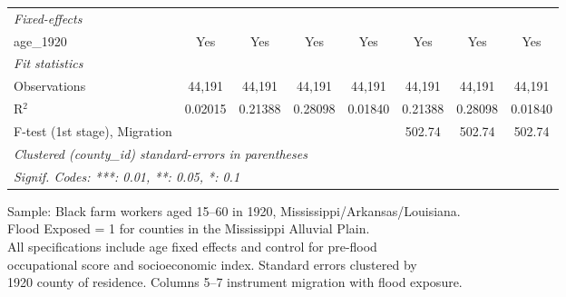 \begin{table}[htbp]
\begin{adjustbox}{max width=\textwidth}
\begin{tabular}{lccccccc}
      \midrule
      \emph{Fixed-effects}\\
      age\_1920                     & Yes            & Yes              & Yes              & Yes              & Yes              & Yes              & Yes\\  
      \midrule
      \emph{Fit statistics}\\
      Observations                  & 44,191         & 44,191           & 44,191           & 44,191           & 44,191           & 44,191           & 44,191\\  
      R$^2$                         & 0.02015        & 0.21388          & 0.28098          & 0.01840          & 0.21388          & 0.28098          & 0.01840\\  
      F-test (1st stage), Migration &                &                  &                  &                  & 502.74           & 502.74           & 502.74\\  
      \midrule \midrule
      \multicolumn{8}{l}{\emph{Clustered (county\_id) standard-errors in parentheses}}\\
      \multicolumn{8}{l}{\emph{Signif. Codes: ***: 0.01, **: 0.05, *: 0.1}}\\
   \end{tabular}
   \end{adjustbox}

   \par \raggedright 
   Sample: Black farm workers aged 15--60 in 1920, Mississippi/Arkansas/Louisiana.\\
   Flood Exposed = 1 for counties in the Mississippi Alluvial Plain.\\
   All specifications include age fixed effects and control for pre-flood\\
   occupational score and socioeconomic index. Standard errors clustered by\\
   1920 county of residence. Columns 5--7 instrument migration with flood exposure.
\end{table}


